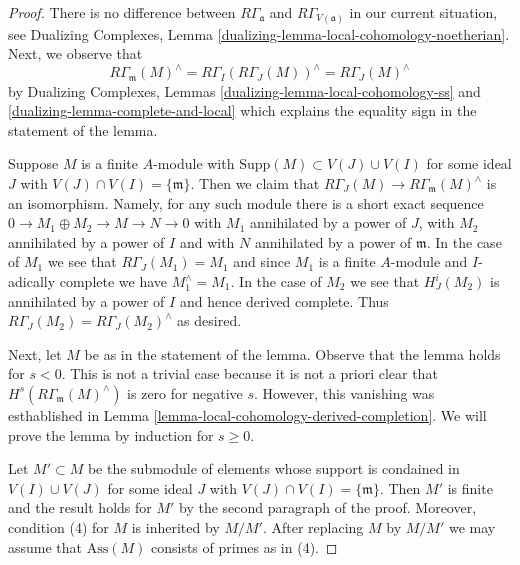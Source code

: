 \begin{proof}
There is no difference between $R\Gamma_\mathfrak a$ and
$R\Gamma_{V(\mathfrak a)}$ in our current situation, see
Dualizing Complexes, Lemma \ref{dualizing-lemma-local-cohomology-noetherian}.
Next, we observe that
$$
R\Gamma_\mathfrak m(M)^\wedge =
R\Gamma_I(R\Gamma_J(M))^\wedge =
R\Gamma_J(M)^\wedge
$$
by Dualizing Complexes, Lemmas \ref{dualizing-lemma-local-cohomology-ss} and
\ref{dualizing-lemma-complete-and-local}
which explains the equality sign in the statement of the lemma.

\medskip\noindent
Suppose $M$ is a finite $A$-module with
$\text{Supp}(M) \subset V(J) \cup V(I)$ for some ideal $J$
with $V(J) \cap V(I) = \{\mathfrak m\}$.
Then we claim that $R\Gamma_J(M) \to R\Gamma_\mathfrak m(M)^\wedge$
is an isomorphism.
Namely, for any such module there is a short exact sequence
$0 \to M_1 \oplus M_2 \to M \to N \to 0$ with
$M_1$ annihilated by a power of $J$, with $M_2$ annihilated
by a power of $I$ and with $N$ annihilated by a power of $\mathfrak m$.
In the case of $M_1$ we see that $R\Gamma_J(M_1) = M_1$ and
since $M_1$ is a finite $A$-module and $I$-adically complete
we have $M_1^\wedge = M_1$.
In the case of $M_2$ we see that $H^i_J(M_2)$ is annihilated
by a power of $I$ and hence derived complete. Thus
$R\Gamma_J(M_2) = R\Gamma_J(M_2)^\wedge$ as desired.

\medskip\noindent
Next, let $M$ be as in the statement of the lemma.
Observe that the lemma holds for $s < 0$. This is not a trivial case because
it is not a priori clear that $H^s(R\Gamma_\mathfrak m(M)^\wedge)$
is zero for negative $s$. However, this vanishing was esthablished
in Lemma \ref{lemma-local-cohomology-derived-completion}.
We will prove the lemma by induction for $s \geq 0$.

\medskip\noindent
Let $M' \subset M$ be the submodule of elements whose
support is condained in $V(I) \cup V(J)$ for some
ideal $J$ with $V(J) \cap V(I) = \{\mathfrak m\}$.
Then $M'$ is finite and the result holds for $M'$ by
the second paragraph of the proof. Moreover, condition (4)
for $M$ is inherited by $M/M'$. After replacing $M$ by
$M/M'$ we may assume that $\text{Ass}(M)$ consists
of primes as in (4).


\end{proof}
